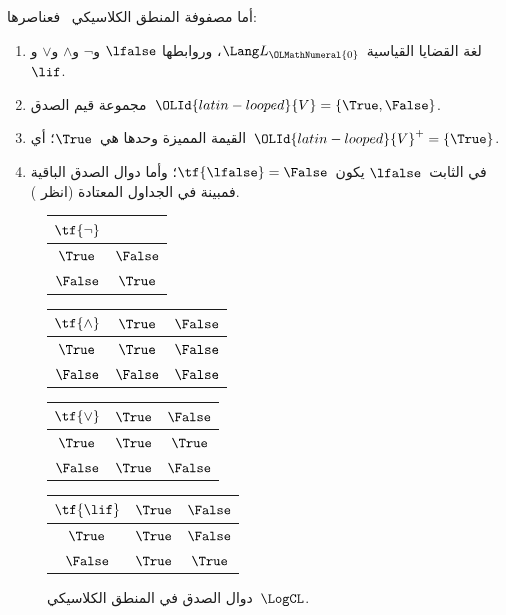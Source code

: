 \documentclass[../../../include/open-logic-section]{subfiles}
\begin{document}
\begin{ex}
أما مصفوفة المنطق الكلاسيكي~\LogCL{} فعناصرها:
\begin{enumerate}
  \item لغة القضايا القياسية~$\Lang L_{\OLMathNumeral{0}}$، وروابطها
  $\lfalse$ و$\lnot$ و$\land$ و$\lor$ و$\lif$.
  \item مجموعة قيم الصدق~${\OLId{latin-looped}{V}} = \{\True, \False\}$.
  \item القيمة المميزة وحدها هي~$\True$؛ أي~${\OLId{latin-looped}{V}}^+ = \{\True\}$.
  \item في الثابت~$\lfalse$ يكون~$\tf{\lfalse} = \False$؛ وأما
  دوال الصدق الباقية فمبينة في الجداول المعتادة (انظر
  ).
\end{enumerate}
\begin{figure}
  \begin{center}
      \begin{tabular}{c|c}
        $\tf{\lnot}$ & \\
        \hline
        $\True$ & $\False$ \\
        $\False$ & $\True$
      \end{tabular}
      \quad
      \begin{tabular}{c|cc}
        $\tf{\land}$ & $\True$ & $\False$ \\
        \hline
        $\True$ & $\True$ & $\False$ \\
        $\False$ & $\False$ & $\False$
      \end{tabular}
      \quad
      \begin{tabular}{c|cc}
        $\tf{\lor}$ & $\True$ & $\False$ \\
        \hline
        $\True$ & $\True$ & $\True$ \\
        $\False$ & $\True$ & $\False$
      \end{tabular}
      \quad
      \begin{tabular}{c|cc}
        $\tf{\lif}$ & $\True$ & $\False$ \\
        \hline
        $\True$ & $\True$ & $\False$ \\
        $\False$ & $\True$ & $\True$
      \end{tabular}
    \end{center}
    \caption{دوال الصدق في المنطق الكلاسيكي~$\LogCL$.}
  \end{figure}
  \end{ex}
\end{document}
